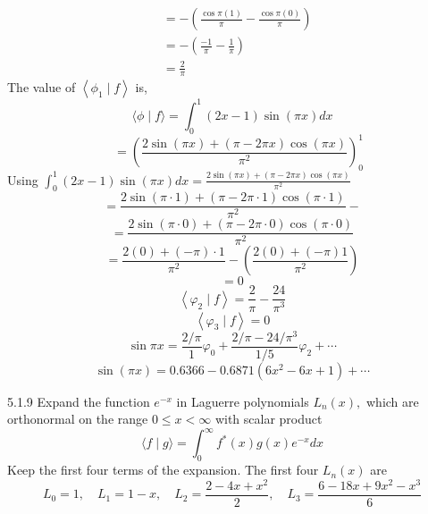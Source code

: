 \documentclass{article}
\begin{document}
\begin{flushleft}
$$\begin{aligned}
&=-\left(\frac{\cos \pi(1)}{\pi}-\frac{\cos \pi(0)}{\pi}\right) \\
&=-\left(\frac{-1}{\pi}-\frac{1}{\pi}\right) \\
&=\frac{2}{\pi}
\end{aligned}
$$
The value of $\left\langle\phi_{1} \mid f\right\rangle$ is,
$$\langle\phi \mid f\rangle=\int_{0}^{1}(2 x-1) \sin (\pi x) d x$$
$$\quad=\left(\frac{2 \sin (\pi x)+(\pi-2 \pi x) \cos (\pi x)}{\pi^{2}}\right)_{0}^{1}$$
Using $\int_{0}^{1}(2 x-1) \sin (\pi x) d x=\frac{2 \sin (\pi x)+(\pi-2 \pi x) \cos (\pi x)}{\pi^{2}}$
$$=\frac{2 \sin (\pi \cdot 1)+(\pi-2 \pi \cdot 1) \cos (\pi \cdot 1)}{\pi^{2}}-$$
$$=\frac{2 \sin (\pi \cdot 0)+(\pi-2 \pi \cdot 0) \cos (\pi \cdot 0)}{\pi^{2}}$$
$$=\frac{2(0)+(-\pi) \cdot 1}{\pi^{2}}-\left(\frac{2(0)+(-\pi) 1}{\pi^{2}}\right)$$
$$=0$$
$$
\left\langle\varphi_{2} \mid f\right\rangle=\frac{2}{\pi}-\frac{24}{\pi^{3}}
$$
$$
\left\langle\varphi_{3} \mid f\right\rangle=0
$$
$$
\sin \pi x=\frac{2 / \pi}{1} \varphi_{0}+\frac{2 / \pi-24 / \pi^{3}}{1 / 5} \varphi_{2}+\cdots
$$
$$\sin(\pi x) =0.6366-0.6871\left(6 x^{2}-6 x+1\right)+\cdots $$

\newpage

\begin{mybox}{5.1.9}
Expand the function $e^{-x}$ in Laguerre polynomials $L_{n}(x),$ which are orthonormal on the range $0 \leq x<\infty$ with scalar product
$$
\langle f \mid g\rangle=\int_{0}^{\infty} f^{*}(x) g(x) e^{-x} d x
$$
Keep the first four terms of the expansion. The first four $L_{n}(x)$ are
$$
L_{0}=1, \quad L_{1}=1-x, \quad L_{2}=\frac{2-4 x+x^{2}}{2}, \quad L_{3}=\frac{6-18 x+9 x^{2}-x^{3}}{6}
$$
\end{mybox}


\end{flushleft}
\end{document}
